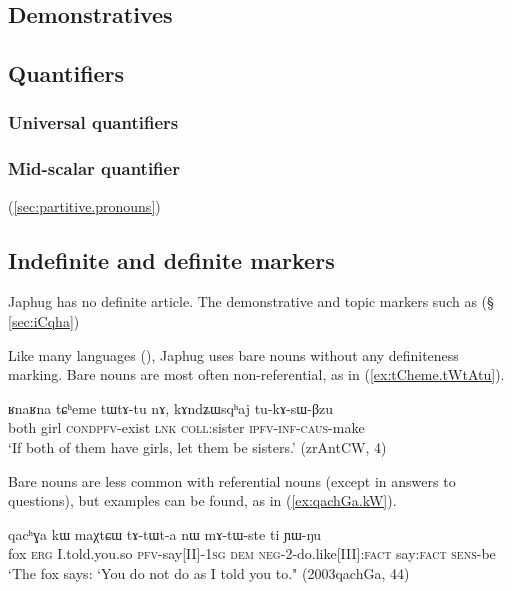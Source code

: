 \subsection{Demonstratives}

\subsection{Quantifiers}
\subsubsection{Universal quantifiers} \label{sec:universal.quant}
\subsubsection{Mid-scalar quantifier} \label{sec:tsuku}
(\ref{sec:partitive.pronouns})
\subsection{Indefinite and definite markers} \label{sec:indefinite.markers}
Japhug has no definite article. The demonstrative  and topic markers such as  (§ \ref{sec:iCqha})

Like many languages (\citealt[130]{creissels06sgit1}), Japhug  uses bare nouns without any definiteness marking. Bare nouns are most often non-referential, as  in (\ref{ex:tCheme.tWtAtu}).

\begin{exe}
\ex \label{ex:tCheme.tWtAtu}
\gll ʁnaʁna tɕʰeme tɯ\redp{}tɤ-tu nɤ, kɤndʑɯsqʰaj 	tu-kɤ-sɯ-βzu \\
both girl \textsc{cond}\redp{}\textsc{pfv}-exist \textsc{lnk} \textsc{coll}:sister \textsc{ipfv}-\textsc{inf}-\textsc{caus}-make \\
\glt `If both of them have girls, let them be sisters.' (zrAntCW, 4)
\end{exe}

Bare nouns are less common with referential nouns (except in answers to questions), but examples can be found, as  in (\ref{ex:qachGa.kW}).

\begin{exe}
\ex \label{ex:qachGa.kW}
\gll qacʰɣa 	kɯ 	maχtɕɯ tɤ-tɯt-a nɯ mɤ-tɯ-ste 	ti 	ɲɯ-ŋu  \\
fox \textsc{erg} I.told.you.so \textsc{pfv}-say[II]-\textsc{1sg} \textsc{dem} \textsc{neg}-2-do.like[III]:\textsc{fact} say:\textsc{fact} \textsc{sens}-be \\
\glt `The fox says: `You do not do as I told you to." (2003qachGa, 44)
\end{exe}

